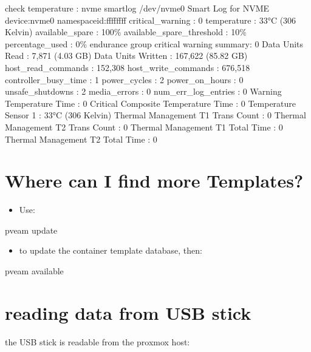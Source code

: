 \documentclass[letterpaper,10pt,english]{sphinxmanual}
\begin{document}
\sphinxAtStartPar
check temperature :
nvme smart\sphinxhyphen{}log /dev/nvme0
Smart Log for NVME device:nvme0 namespace\sphinxhyphen{}id:ffffffff
critical\_warning                        : 0
temperature                             : 33°C (306 Kelvin)
available\_spare                         : 100\%
available\_spare\_threshold               : 10\%
percentage\_used                         : 0\%
endurance group critical warning summary: 0
Data Units Read                         : 7,871 (4.03 GB)
Data Units Written                      : 167,622 (85.82 GB)
host\_read\_commands                      : 152,308
host\_write\_commands                     : 676,518
controller\_busy\_time                    : 1
power\_cycles                            : 2
power\_on\_hours                          : 0
unsafe\_shutdowns                        : 2
media\_errors                            : 0
num\_err\_log\_entries                     : 0
Warning Temperature Time                : 0
Critical Composite Temperature Time     : 0
Temperature Sensor 1           : 33°C (306 Kelvin)
Thermal Management T1 Trans Count       : 0
Thermal Management T2 Trans Count       : 0
Thermal Management T1 Total Time        : 0
Thermal Management T2 Total Time        : 0

\sphinxstepscope


\chapter{Where can I find more Templates?}
\label{\detokenize{templates:where-can-i-find-more-templates}}\label{\detokenize{templates::doc}}\begin{itemize}
\item {} 
\sphinxAtStartPar
Use:

\end{itemize}

\sphinxAtStartPar
pveam update
\begin{itemize}
\item {} 
\sphinxAtStartPar
to update the container template database, then:

\end{itemize}

\sphinxAtStartPar
pveam available

\sphinxstepscope


\chapter{reading data from USB stick}
\label{\detokenize{usb:reading-data-from-usb-stick}}\label{\detokenize{usb::doc}}
\sphinxAtStartPar
the USB stick is readable from the proxmox host:
\end{document}
